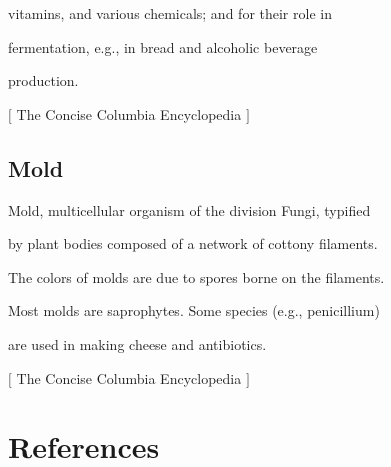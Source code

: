 vitamins, and various chemicals; and for their role in$\text{ }$\newline{}

fermentation, e.g., in bread and alcoholic beverage$\text{ }$\newline{}

production.$\text{ }$\newline{}

{$\text{[}$} The Concise Columbia Encyclopedia {$\text{]}$} 

\subsection{Mold}
\label{22}

Mold, multicellular organism of the division Fungi, typified$\text{ }$\newline{}

by plant bodies composed of a network of cottony filaments.$\text{ }$\newline{}

The colors of molds are due to spores borne on the filaments.$\text{ }$\newline{}

Most molds are saprophytes.  Some species (e.g., penicillium)$\text{ }$\newline{}

are used in making cheese and antibiotics.$\text{ }$\newline{}

{$\text{[}$} The Concise Columbia Encyclopedia {$\text{]}$}

\section{References}
\label{23}

